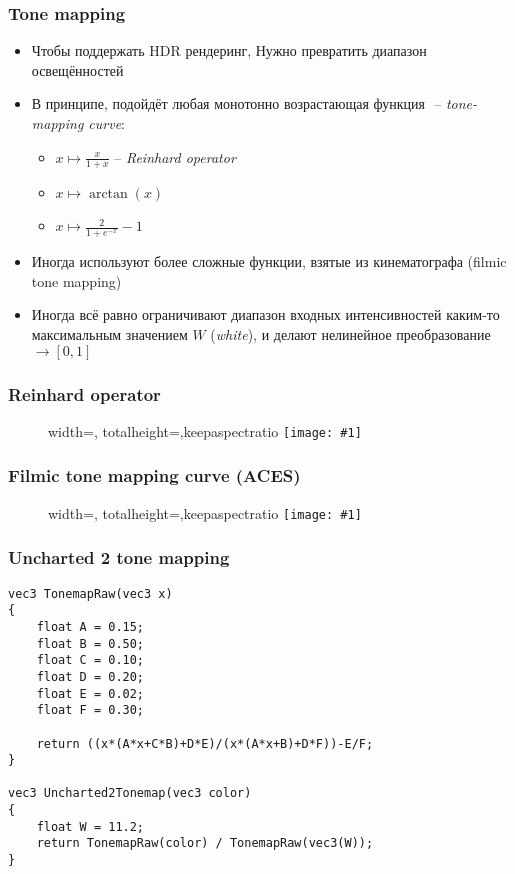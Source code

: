 \documentclass[10pt]{beamer}
\newcommand{\slideimage}[1]{
  \begin{figure}
    \begin{adjustbox}{width=\textwidth, totalheight=\textheight-2\baselineskip-2\baselineskip,keepaspectratio}
      \texttt{[image: \#1]}
    \end{adjustbox}
  \end{figure}
}
\begin{document}
\begin{frame}[fragile]
\frametitle{Tone mapping}
\begin{itemize}
\item Чтобы поддержать HDR рендеринг, Нужно превратить диапазон освещённостей \begin{math}[0, \infty)\end{math} в диапазон \begin{math}[0, 1]\end{math}
\pause
\item В принципе, подойдёт любая монотонно возрастающая функция \begin{math}[0, \infty)\rightarrow [0, 1]\end{math} -- \textit{tone-mapping curve}:
\begin{itemize}
\item \begin{math}x \mapsto \frac{x}{1+x}\end{math} -- \textit{Reinhard operator}
\item \begin{math}x \mapsto \arctan(x)\end{math}
\item \begin{math}x \mapsto \frac{2}{1+e^{-x}}-1\end{math}
\end{itemize}
\pause
\item Иногда используют более сложные функции, взятые из кинематографа (filmic tone mapping)
\pause
\item Иногда всё равно ограничивают диапазон входных интенсивностей каким-то максимальным значением \begin{math}W\end{math} (\textit{white}), и делают нелинейное преобразование \begin{math}[0, W] \rightarrow [0, 1]\end{math}
\end{itemize}
\end{frame}

\begin{frame}[fragile]
\frametitle{Reinhard operator}
\slideimage{reinhard.png}
\end{frame}

\begin{frame}[fragile]
\frametitle{Filmic tone mapping curve (ACES)}
\slideimage{aces.png}
\end{frame}

\begin{frame}[fragile]
\frametitle{Uncharted 2 tone mapping}
\begin{verbatim}
vec3 TonemapRaw(vec3 x)
{
    float A = 0.15;
    float B = 0.50;
    float C = 0.10;
    float D = 0.20;
    float E = 0.02;
    float F = 0.30;

    return ((x*(A*x+C*B)+D*E)/(x*(A*x+B)+D*F))-E/F;
}

vec3 Uncharted2Tonemap(vec3 color)
{
    float W = 11.2;
    return TonemapRaw(color) / TonemapRaw(vec3(W));
}
\end{verbatim}
\end{frame}
\end{document}

